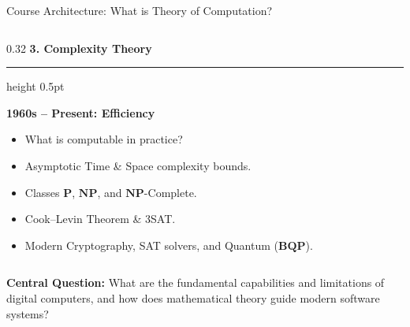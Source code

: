 \documentclass[aspectratio=169, 10pt]{beamer}
\newcommand{\colheader}[1]{%
  {\noindent\footnotesize\bfseries\color{gimpanavy}#1}%
  \vspace{0.02cm}%
  {\color{gimpanavy!30}\hrule height 0.5pt}%
  \vspace{0.05cm}%
}
\newcommand{\cardtitle}[1]{{\noindent\footnotesize\bfseries\color{gimpanavy}#1}\par\vspace{0.03cm}}
\begin{document}
\begin{frame}{Course Architecture: What is Theory of Computation?}
\begin{columns}[T]
    \begin{column}{0.32\textwidth}
      \colheader{3. Complexity Theory}
      \begin{tcolorbox}[conceptcard]
        \cardtitle{1960s -- Present: Efficiency}
        \begin{itemize}\setlength{\itemsep}{1.5pt}\scriptsize
          \item What is computable in practice?
          \item Asymptotic Time \& Space complexity bounds.
          \item Classes $\mathbf{P}$, $\mathbf{NP}$, and $\mathbf{NP}$-Complete.
          \item Cook--Levin Theorem \& 3SAT.
          \item Modern Cryptography, SAT solvers, and Quantum ($\mathbf{BQP}$).
        \end{itemize}
      \end{tcolorbox}
    \end{column}
  \end{columns}
  
  \vspace{0.10cm}
  \begin{tcolorbox}[spotlightcard]
    {\footnotesize\textbf{Central Question:} What are the fundamental capabilities and limitations of digital computers, and how does mathematical theory guide modern software systems?}
  \end{tcolorbox}
\end{frame}
\end{document}
